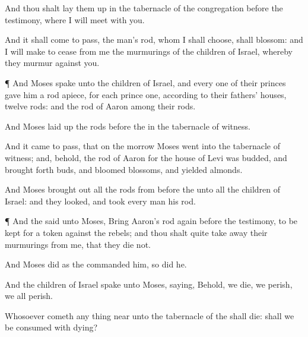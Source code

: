 {And thou shalt lay them
up in the
tabernacle of the
congregation
before the
testimony, where I will
meet with you.

And it shall come to pass,
{} the
man’s
rod, whom I shall
choose, shall
blossom: and I will make to
cease from me the
murmurings of the
children of
Israel, whereby they
murmur against you.


\par }{\PP {}¶ And
Moses
spake unto the
children of
Israel, and every one of their
princes
gave him a
rod apiece, for each
prince
one, according to their
fathers’
houses,
{}
twelve
rods: and the
rod of
Aaron
{}
among their
rods.

And
Moses laid
up the
rods
before the
{} in the
tabernacle of
witness.


\par }{\PP {}And it came to pass, that on the
morrow
Moses
went into the
tabernacle of
witness; and, behold, the
rod of
Aaron for the
house of
Levi was
budded, and brought
forth
buds, and
bloomed
blossoms, and
yielded
almonds.

And
Moses brought
out all the
rods from
before the
{} unto all the
children of
Israel: and they
looked, and
took every
man his
rod.


\par }{\PP {}¶ And the
{}
said unto
Moses,
Bring
Aaron’s
rod
again
before the
testimony, to be
kept for a
token against the
rebels; and thou shalt quite take
away their
murmurings from me, that they
die not.

And
Moses
did
{} as the
{}
commanded him, so
did he.

And the
children of
Israel
spake unto
Moses,
saying, Behold, we
die, we
perish, we all
perish.

Whosoever cometh any thing
near unto the
tabernacle of the
{} shall
die: shall we be
consumed with
dying?




\par }
